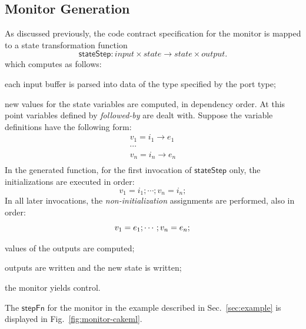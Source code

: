 \documentclass[global,twocolumn]{svjour}
\newcommand{\konst}[1]{\ensuremath{\mathsf{#1}}}
\newcommand{\figref}[1]{Fig.~\ref{#1}}
\newcommand{\secref}[1]{Sec.~\ref{#1}}
\begin{document}

\subsection{Monitor Generation}

As discussed previously, the code contract specification for the monitor is mapped to a state transformation function
%
\[
\konst{stateStep} : \mathit{input} \times \mathit{state} \to \mathit{state} \times \mathit{output}.
\]
%
which computes as follows:
%
\begin{compactenum}

\item each input buffer is parsed into data of the type specified by the port type;

\item
new values for the state variables are computed, in dependency order.
%
At this point variables defined by \emph{followed-by} are dealt with.
%
Suppose the variable definitions have the following form:
%
\[
\begin{array}{l}
  v_1 = i_1 \longrightarrow e_1 \\
  \cdots \\
  v_n = i_n \longrightarrow e_n \\
\end{array}
\]
%
In the generated function, for the first invocation of \konst{stateStep} only, the initializations are executed in order:
%
\[
  v_1 = i_1; \cdots ;  v_n = i_n;
\]
%
In all later invocations, the \emph{non-initialization} assignments are performed, also in order:
%
\[
  v_1 = e_1; \cdots ; v_n = e_n; \\
\]

\item values of the outputs are computed;

\item outputs are written and the new state is written;

\item the monitor yields control.
\end{compactenum}
\noindent The \konst{stepFn} for the monitor in the example described in \secref{sec:example} is displayed in \figref{fig:monitor-cakeml}.
\end{document}

